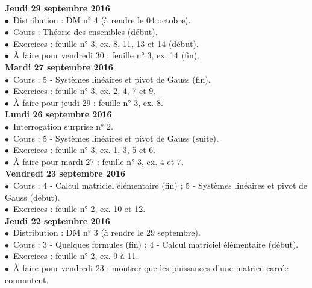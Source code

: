 \documentclass[12pt,a4paper]{article}
\begin{document}
\noindent\textbf{Jeudi 29 septembre 2016 }\\
$\bullet$\ Distribution : DM n° 4 (à rendre le 04 octobre).\\
$\bullet$\ Cours : Théorie des ensembles (début).\\
$\bullet$\ Exercices : feuille n° 3, ex. 8, 11, 13 et 14 (début).\\
$\bullet$\ À faire pour vendredi 30 : feuille n° 3, ex. 14 (fin).\vspace{.4cm}\\

\noindent\textbf{\bf Mardi 27 septembre 2016 }\\
$\bullet$\ Cours : 5 - Systèmes linéaires et pivot de Gauss (fin).\\
$\bullet$\ Exercices : feuille n° 3, ex. 2, 4, 7 et 9.\\
$\bullet$\ À faire pour jeudi 29 : feuille n° 3, ex. 8.\vspace{.4cm}\\

\noindent\textbf{Lundi 26 septembre 2016 }\\
$\bullet$\ Interrogation surprise n° 2.\\
$\bullet$\ Cours : 5 - Systèmes linéaires et pivot de Gauss (suite).\\
$\bullet$\ Exercices : feuille n° 3, ex. 1, 3, 5 et 6.\\
$\bullet$\ À faire pour mardi 27 : feuille n° 3, ex. 4 et 7.\vspace{.4cm}\\

\noindent\textbf{Vendredi 23 septembre 2016 }\\
$\bullet$\ Cours : 4 - Calcul matriciel élémentaire (fin) ; 5 - Systèmes linéaires et pivot de Gauss (début).\\
$\bullet$\ Exercices : feuille n° 2, ex. 10 et 12.\vspace{.4cm}\\

\noindent\textbf{Jeudi 22 septembre 2016 }\\
$\bullet$\ Distribution : DM n° 3 (à rendre le 29 septembre).\\
$\bullet$\ Cours : 3 - Quelques formules (fin) ; 4 - Calcul matriciel
élémentaire (début).\\
$\bullet$\ Exercices : feuille n° 2, ex. 9 à 11.\\
$\bullet$\ À faire pour vendredi 23 : montrer que les puissances d'une matrice carrée commutent.\vspace{.4cm}\\
\end{document}
